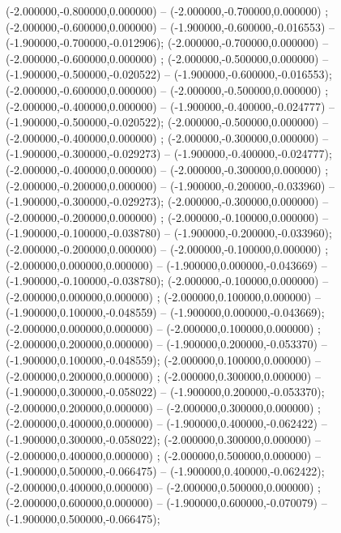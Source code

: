  (-2.000000,-0.800000,0.000000) -- (-2.000000,-0.700000,0.000000) ;
 (-2.000000,-0.600000,0.000000) -- (-1.900000,-0.600000,-0.016553) -- (-1.900000,-0.700000,-0.012906);
 (-2.000000,-0.700000,0.000000) -- (-2.000000,-0.600000,0.000000) ;
 (-2.000000,-0.500000,0.000000) -- (-1.900000,-0.500000,-0.020522) -- (-1.900000,-0.600000,-0.016553);
 (-2.000000,-0.600000,0.000000) -- (-2.000000,-0.500000,0.000000) ;
 (-2.000000,-0.400000,0.000000) -- (-1.900000,-0.400000,-0.024777) -- (-1.900000,-0.500000,-0.020522);
 (-2.000000,-0.500000,0.000000) -- (-2.000000,-0.400000,0.000000) ;
 (-2.000000,-0.300000,0.000000) -- (-1.900000,-0.300000,-0.029273) -- (-1.900000,-0.400000,-0.024777);
 (-2.000000,-0.400000,0.000000) -- (-2.000000,-0.300000,0.000000) ;
 (-2.000000,-0.200000,0.000000) -- (-1.900000,-0.200000,-0.033960) -- (-1.900000,-0.300000,-0.029273);
 (-2.000000,-0.300000,0.000000) -- (-2.000000,-0.200000,0.000000) ;
 (-2.000000,-0.100000,0.000000) -- (-1.900000,-0.100000,-0.038780) -- (-1.900000,-0.200000,-0.033960);
 (-2.000000,-0.200000,0.000000) -- (-2.000000,-0.100000,0.000000) ;
 (-2.000000,0.000000,0.000000) -- (-1.900000,0.000000,-0.043669) -- (-1.900000,-0.100000,-0.038780);
 (-2.000000,-0.100000,0.000000) -- (-2.000000,0.000000,0.000000) ;
 (-2.000000,0.100000,0.000000) -- (-1.900000,0.100000,-0.048559) -- (-1.900000,0.000000,-0.043669);
 (-2.000000,0.000000,0.000000) -- (-2.000000,0.100000,0.000000) ;
 (-2.000000,0.200000,0.000000) -- (-1.900000,0.200000,-0.053370) -- (-1.900000,0.100000,-0.048559);
 (-2.000000,0.100000,0.000000) -- (-2.000000,0.200000,0.000000) ;
 (-2.000000,0.300000,0.000000) -- (-1.900000,0.300000,-0.058022) -- (-1.900000,0.200000,-0.053370);
 (-2.000000,0.200000,0.000000) -- (-2.000000,0.300000,0.000000) ;
 (-2.000000,0.400000,0.000000) -- (-1.900000,0.400000,-0.062422) -- (-1.900000,0.300000,-0.058022);
 (-2.000000,0.300000,0.000000) -- (-2.000000,0.400000,0.000000) ;
 (-2.000000,0.500000,0.000000) -- (-1.900000,0.500000,-0.066475) -- (-1.900000,0.400000,-0.062422);
 (-2.000000,0.400000,0.000000) -- (-2.000000,0.500000,0.000000) ;
 (-2.000000,0.600000,0.000000) -- (-1.900000,0.600000,-0.070079) -- (-1.900000,0.500000,-0.066475);
